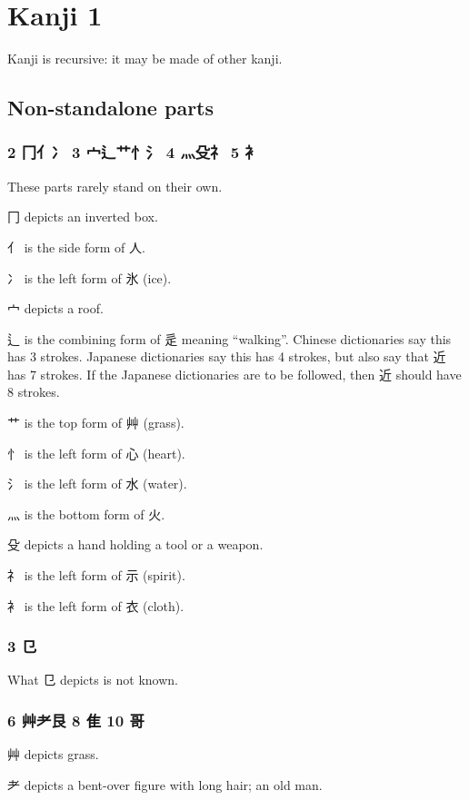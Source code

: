 \chapter{Kanji 1}

Kanji is recursive: it may be made of other kanji.

\section{Non-standalone parts}

\subsection{2 冂亻冫 3 宀辶艹忄氵 4 灬殳礻 5 衤}

These parts rarely stand on their own.

冂 depicts an inverted box.

亻 is the side form of 人.

冫 is the left form of 氷 (ice).

宀 depicts a roof.

辶 is the combining form of 辵 meaning ``walking''.
Chinese dictionaries say this has 3 strokes.
Japanese dictionaries say this has 4 strokes,
but also say that 近 has 7 strokes.
If the Japanese dictionaries are to be followed,
then 近 should have 8 strokes.

艹 is the top form of 艸 (grass).

忄 is the left form of 心 (heart).

氵 is the left form of 水 (water).

灬 is the bottom form of 火.

殳 depicts a hand holding a tool or a weapon.

礻 is the left form of ⽰ (spirit).

衤 is the left form of 衣 (cloth).

\subsection{3 㔾}

What 㔾 depicts is not known.

\subsection{6 艸耂艮 8 隹 10 哥}

艸 depicts grass.

耂 depicts a bent-over figure with long hair; an old man.

